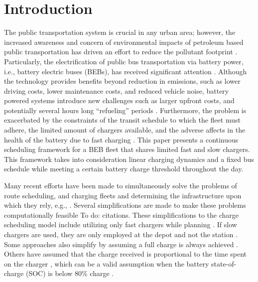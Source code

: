 \documentclass[utf8]{FrontiersinHarvard}
\let\cite\citep                                                                 %
\newcommand{\TODO}[1]{{\color{green} To do: #1}}                                %
\begin{document}

\section{Introduction}
\label{sec:introduction}
The public transportation system is crucial in any urban area; however, the increased awareness and concern of
environmental impacts of petroleum based public transportation has driven an effort to reduce the pollutant footprint
\cite{DeFilippo2014, Xylia2018, Guida2017, Li2016}. Particularly, the electrification of public bus transportation via
battery power, i.e., battery electric buses (BEBs), has received significant attention \cite{Li2016}. Although the
technology provides benefits beyond reduction in emissions, such as lower driving costs, lower maintenance costs, and
reduced vehicle noise, battery powered systems introduce new challenges such as larger upfront costs, and potentially
several hours long ``refueling'' periods \cite{Xylia2018, Li2016}. Furthermore, the problem is exacerbated by the
constraints of the transit schedule to which the fleet must adhere, the limited amount of chargers available, and the
adverse affects in the health of the battery due to fast charging \cite{Lutsey2019}. This paper presents a continuous
scheduling framework for a BEB fleet that shares limited fast and slow chargers. This framework takes into consideration
linear charging dynamics and a fixed bus schedule while meeting a certain battery charge threshold throughout the day.

Many recent efforts have been made to simultaneously solve the problems of route scheduling, and charging fleets and
determining the infrastructure upon which they rely, e.g., \cite{Wei2018, Sebastiani2016, Hoke2014, Wang2017}. Several
simplifications are made to make these problems computationally feasible \TODO{citations}. These simplifications to the
charge scheduling model include utilizing only fast chargers while planning \cite{Wei2018, Sebastiani2016, Wang2017,
  Zhou2020-0, Liu2020, Yang2018, Wang2017a, Qin2016}. If slow chargers are used, they are only employed at the depot and
not the station \cite{He2020, Tang2019}. Some approaches also simplify by assuming a full charge is always achieved
\cite{Wei2018, Wang2017, Zhou2020-0, Wang2017a}. Others have assumed that the charge received is proportional to the
time spent on the charger \cite{Liu2020, Yang2018}, which can be a valid assumption when the battery state-of-charge
(SOC) is below 80\% charge \cite{Liu2020}.
\end{document}
